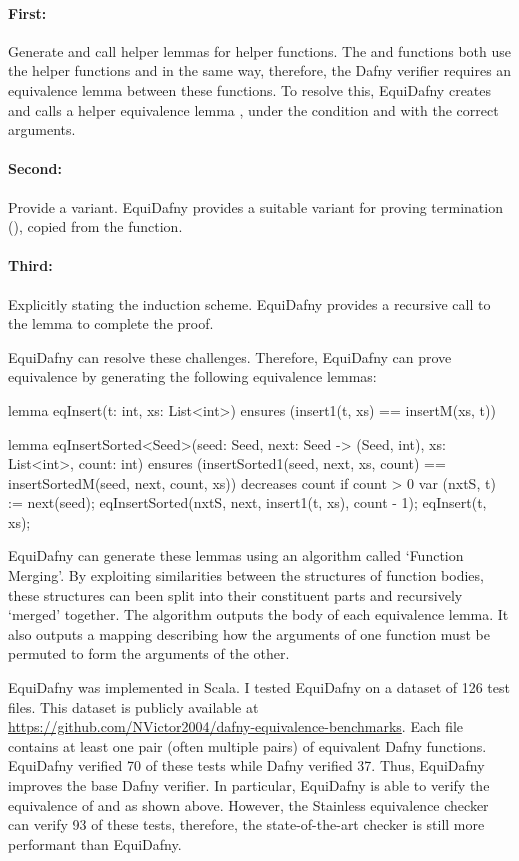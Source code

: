 \paragraph{First:} Generate and call helper lemmas for helper functions. The  and  functions both use the helper functions  and  in the same way, therefore, the Dafny verifier requires an equivalence lemma between these functions. To resolve this, EquiDafny creates and calls a helper equivalence lemma , under the condition  and with the correct arguments.
\paragraph{Second:} Provide a variant. EquiDafny provides a suitable variant for proving termination (), copied from the  function.
\paragraph{Third:} Explicitly stating the induction scheme. EquiDafny provides a recursive call to the  lemma to complete the proof. 

EquiDafny can resolve these challenges. Therefore, EquiDafny can prove equivalence by generating the following equivalence lemmas:
\begin{dafny}
lemma eqInsert(t: int, xs: List<int>)
  ensures (insert1(t, xs) == insertM(xs, t))
{}

lemma eqInsertSorted<Seed>(seed: Seed, next: Seed -> (Seed, int), 
                           xs: List<int>, count: int)
  ensures (insertSorted1(seed, next, xs, count) 
           == insertSortedM(seed, next, count, xs))
  decreases count
{
  if count > 0 {
    var (nxtS, t) := next(seed);
    eqInsertSorted(nxtS, next, insert1(t, xs), count - 1);
    eqInsert(t, xs);
  }
}
\end{dafny}
%
EquiDafny can generate these lemmas using an algorithm called `Function Merging'. By exploiting similarities between the structures of function bodies, these structures can been split into their constituent parts and recursively `merged' together. The algorithm outputs the body of each equivalence lemma. It also outputs a mapping describing how the arguments of one function must be permuted to form the arguments of the other. 

EquiDafny was implemented in Scala. I tested EquiDafny on a dataset of 126 test files. This dataset is publicly available at \\\url{https://github.com/NVictor2004/dafny-equivalence-benchmarks}. Each file contains at least one pair (often multiple pairs) of equivalent Dafny functions. EquiDafny verified 70 of these tests while Dafny verified 37. Thus, EquiDafny improves the base Dafny verifier. In particular, EquiDafny is able to verify the equivalence of  and  as shown above. However, the Stainless equivalence checker can verify 93 of these tests, therefore, the state-of-the-art checker is still more performant than EquiDafny. 

